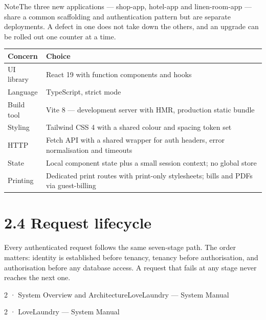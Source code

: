 \documentclass[11pt,a4paper,oneside]{book}
\begin{document}
\begin{notebox}NoteThe three new applications — shop-app, hotel-app and linen-room-app — share a common scaffolding and authentication pattern but are separate deployments. A defect in one does not take down the others, and an upgrade can be rolled out one counter at a time.\end{notebox}
\begin{center}\small
\begin{tabularx}{\linewidth}{|X|X|}
\hline
\rowcolor{lightgrey}
\textbf{Concern} & \textbf{Choice} \\ \hline
UI library & React 19 with function components and hooks \\ \hline
Language & TypeScript, strict mode \\ \hline
Build tool & Vite 8 — development server with HMR, production static bundle \\ \hline
Styling & Tailwind CSS 4 with a shared colour and spacing token set \\ \hline
HTTP & Fetch API with a shared wrapper for auth headers, error normalisation and timeouts \\ \hline
State & Local component state plus a small session context; no global store \\ \hline
Printing & Dedicated print routes with print-only stylesheets; bills and PDFs via guest-billing \\ \hline
\end{tabularx}
\end{center}
\section{2.4 Request lifecycle}
Every authenticated request follows the same seven-stage path. The order matters: identity is established before tenancy, tenancy before authorisation, and authorisation before any database access. A request that fails at any stage never reaches the next one.

2 · System Overview and ArchitectureLoveLaundry — System Manual

2 · LoveLaundry — System Manual
\end{document}
